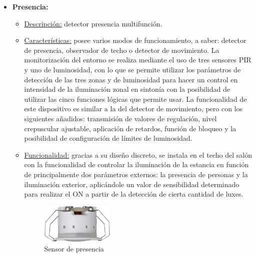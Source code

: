 \begin{itemize}
\item \textbf{Presencia:} 
	\begin{itemize}
	\item\underline{Descripción:} detector presencia multifunción.
	\item \underline{Características:} posee varios modos de funcionamiento, a saber: detector de presencia, observador de techo o detector de movimiento. La monitorización del entorno se realiza mediante el uso de tres sensores PIR y uno de luminosidad, con lo que se permite utilizar los parámetros de detección de las tres zonas y de luminosidad para hacer un control en intensidad de la iluminación zonal en sintonía con la posibilidad de utilizar las cinco funciones lógicas que permite usar. La funcionalidad de este dispositivo es similar a la del detector de movimiento, pero con los siguientes añadidos: transmisión de valores de regulación, nivel crepuscular ajustable, aplicación de retardos, función de bloqueo y la posibilidad de configuración de límites de luminosidad.
	\item \underline{Funcionalidad:} gracias a su diseño discreto, se instala en el techo del salón con la funcionalidad de controlar la iluminación de la estancia en función de principalmente dos parámetros externos: la presencia de personas y la iluminación exterior, aplicándole un valor de sensibilidad determinado para realizar el ON a partir de la detección de cierta cantidad de luxes.
	\begin{figure}[h]
	\centering
	\includegraphics[width=0.35\textwidth]{figures/sensor_presencia.png}   
	\caption{Sensor de presencia}
	\label{fig:sensor_presencia}
	\end{figure}
	\end{itemize}


\end{itemize}
